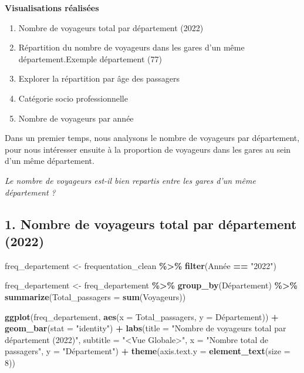 \documentclass[
]{article}
\newenvironment{Shaded}{\begin{snugshade}}{\end{snugshade}}
\newcommand{\AttributeTok}[1]{\textcolor[rgb]{0.13,0.29,0.53}{#1}}
\newcommand{\DecValTok}[1]{\textcolor[rgb]{0.00,0.00,0.81}{#1}}
\newcommand{\FunctionTok}[1]{\textcolor[rgb]{0.13,0.29,0.53}{\textbf{#1}}}
\newcommand{\NormalTok}[1]{#1}
\newcommand{\OtherTok}[1]{\textcolor[rgb]{0.56,0.35,0.01}{#1}}
\newcommand{\SpecialCharTok}[1]{\textcolor[rgb]{0.81,0.36,0.00}{\textbf{#1}}}
\newcommand{\StringTok}[1]{\textcolor[rgb]{0.31,0.60,0.02}{#1}}
\begin{document}
\textbf{Visualisations réalisées}

\begin{enumerate}
\def\labelenumi{\arabic{enumi}.}
\item
  Nombre de voyageurs total par département (2022)
\item
  Répartition du nombre de voyageurs dans les gares d'un même
  département.Exemple département (77)
\item
  Explorer la répartition par âge des passagers
\item
  Catégorie socio professionnelle
\item
  Nombre de voyageurs par année
\end{enumerate}

Dans un premier temps, nous analysons le nombre de voyageurs par
département, pour nous intéresser ensuite à la proportion de voyageurs
dans les gares au sein d'un même département.

\emph{Le nombre de voyageurs est-il bien repartis entre les gares d'un
même département ?}

\hypertarget{nombre-de-voyageurs-total-par-duxe9partement-2022}{%
\subsection{1. Nombre de voyageurs total par département
(2022)}\label{nombre-de-voyageurs-total-par-duxe9partement-2022}}

\begin{Shaded}
\begin{Highlighting}[]
\NormalTok{freq\_departement }\OtherTok{\textless{}{-}}\NormalTok{ frequentation\_clean }\SpecialCharTok{\%\textgreater{}\%}
  \FunctionTok{filter}\NormalTok{(Année }\SpecialCharTok{==} \StringTok{"2022"}\NormalTok{)}

\NormalTok{freq\_departement }\OtherTok{\textless{}{-}}\NormalTok{ freq\_departement }\SpecialCharTok{\%\textgreater{}\%}
  \FunctionTok{group\_by}\NormalTok{(Département) }\SpecialCharTok{\%\textgreater{}\%}
  \FunctionTok{summarize}\NormalTok{(}\AttributeTok{Total\_passagers =} \FunctionTok{sum}\NormalTok{(Voyageurs))}

\FunctionTok{ggplot}\NormalTok{(freq\_departement, }\FunctionTok{aes}\NormalTok{(}\AttributeTok{x =}\NormalTok{ Total\_passagers, }\AttributeTok{y =}\NormalTok{ Département)) }\SpecialCharTok{+}
  \FunctionTok{geom\_bar}\NormalTok{(}\AttributeTok{stat =} \StringTok{"identity"}\NormalTok{) }\SpecialCharTok{+}
  \FunctionTok{labs}\NormalTok{(}\AttributeTok{title =} \StringTok{"Nombre de voyageurs total par département (2022)"}\NormalTok{,}
       \AttributeTok{subtitle =} \StringTok{"\textless{}Vue Globale\textgreater{}"}\NormalTok{,}
       \AttributeTok{x =} \StringTok{"Nombre total de passagers"}\NormalTok{,}
       \AttributeTok{y =} \StringTok{"Département"}\NormalTok{) }\SpecialCharTok{+}
  \FunctionTok{theme}\NormalTok{(}\AttributeTok{axis.text.y =} \FunctionTok{element\_text}\NormalTok{(}\AttributeTok{size =} \DecValTok{8}\NormalTok{))}
\end{Highlighting}
\end{Shaded}
\end{document}
